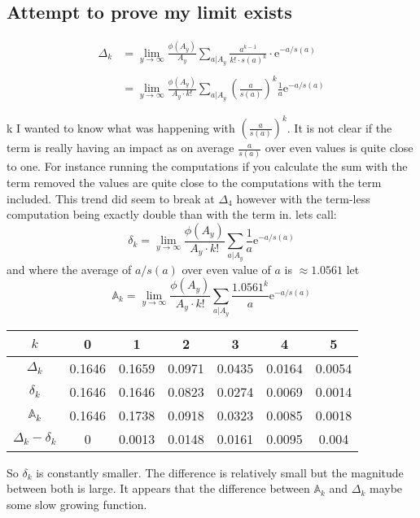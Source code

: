 \documentclass{article}
\begin{document}
\subsection*{Attempt to prove my limit exists}
\begin{align*}
    \Delta_k &= \lim_{y \to \infty} \frac{\phi(A_y)}{A_y} \sum_{a|A_{y}} \frac{a^{k-1}}{k! \cdot s(a)^k} \cdot \text{e}^{-a/s(a)}\\\\
    &= \lim_{y \to \infty} \frac{\phi(A_y)}{A_y \cdot k!} \sum_{a|A_{y}} \left(\frac{a}{ s(a)}\right)^k  \frac{1}{a} \text{e}^{-a/s(a)}
\end{align*}

\noindent k I wanted to know what was happening with $\left(\frac{a}{ s(a)}\right)^k$. It is not clear if the term is really having an impact as on average $\frac{a}{s(a)}$ over even values is quite close to one. For instance running the computations if you calculate the sum with the term removed the values are quite close to the  computations with the term included. This trend did seem to break at $\Delta_4$ however with the term-less computation being exactly double than with the term in. lets call: $$\delta_k = \lim_{y \to \infty} \frac{\phi(A_y)}{A_y \cdot k!} \sum_{a|A_{y}}  \frac{1}{a} \text{e}^{-a/s(a)}$$ and where the average of $a/s(a)$ over even value of $a$ is $\approx 1.0561$ let $$\mathbb{A}_k = \lim_{y \to \infty} \frac{\phi(A_y)}{A_y \cdot k!} \sum_{a|A_{y}}  \frac{1.0561^k}{a} \text{e}^{-a/s(a)}$$

\begin{center}
\begin{tabular}{ c | c c c c c c}

 $k$ & 0 & 1 & 2 & 3 & 4 & 5\\ 
 \hline
 $\Delta_k$ &  0.1646 & 0.1659 & 0.0971 & 0.0435 & 0.0164 & 0.0054\\  
 $\delta_k$ &  0.1646 & 0.1646 & 0.0823 & 0.0274 & 0.0069 & 0.0014 \\  
 $\mathbb{A}_k$ &  0.1646 & 0.1738 & 0.0918 & 0.0323 & 0.0085 & 0.0018 \\ 
 $\Delta_k -\delta_k$ &  0 & 0.0013 & 0.0148 & 0.0161 & 0.0095 & 0.004 \\ 
 
\end{tabular}
\end{center}
So $\delta_k$ is constantly smaller. The difference is relatively small but the magnitude between both is large.  It appears that the difference between $\mathbb{A}_k$ and $\Delta_k$ maybe some slow growing function.
\end{document}
